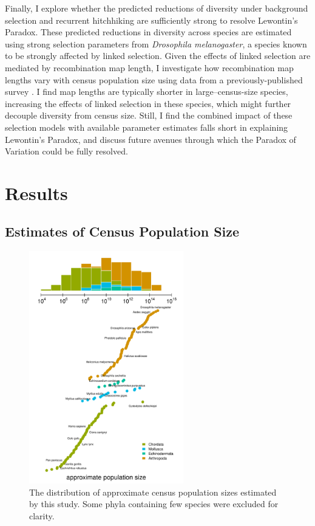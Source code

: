 \documentclass[11pt]{article}
\begin{document}
Finally, I explore whether the predicted reductions of diversity under
background selection and recurrent hitchhiking are sufficiently strong to
resolve Lewontin's Paradox. These predicted reductions in diversity across
species are estimated using strong selection parameters from \emph{Drosophila
melanogaster}, a species known to be strongly affected by linked selection.
Given the effects of linked selection are mediated by recombination map length,
I investigate how recombination map lengths vary with census population size
using data from a previously-published survey \parencite{Stapley2017-fs}. I
find map lengths are typically shorter in large--census-size species,
increasing the effects of linked selection in these species, which might
further decouple diversity from census size. Still, I find the combined impact
of these selection models with available parameter estimates falls short in
explaining Lewontin's Paradox, and discuss future avenues through which the
Paradox of Variation could be fully resolved.

\section*{Results}

\subsection*{Estimates of Census Population Size}

\begin{figure}[t!]
  \centering
  \includegraphics[width=0.6\textwidth]{figures/Nc_figure.pdf}
  \caption{
     The distribution of approximate census population sizes estimated by this
     study. Some phyla containing few species were excluded for clarity.}
\label{fig:figure-nc}
\end{figure}
\end{document}
